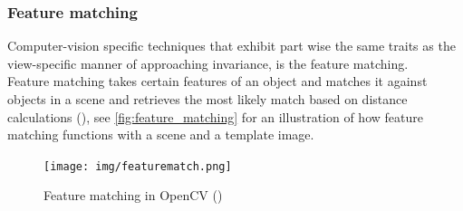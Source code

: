 \documentclass{article}
\newcommand{\goodcite}[1]{ {(\cite{#1})}}
\begin{document}
\subsubsection{Feature matching}
Computer-vision specific techniques that exhibit part wise the same traits as the view-specific manner of approaching invariance, is the feature matching.\\Feature matching takes certain features of an object and matches it against objects in a scene and retrieves the most likely match based on distance calculations\goodcite{OpenCV}, see \autoref{fig:feature_matching} for an illustration of how feature matching functions with a scene and a template image.\medskip \\

\begin{figure}[H]
    \centering
    \texttt{[image: img/featurematch.png]}
    \caption{Feature matching in OpenCV\goodcite{OpenCV}}
    \label{fig:feature_matching}
\end{figure}


\end{document}
